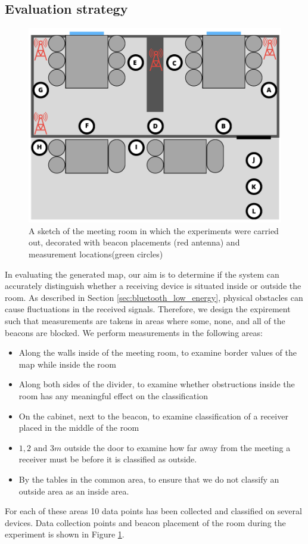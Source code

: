 \subsection{Evaluation strategy} %
\begin{figure}[h]
    \centering
    \includegraphics[scale=0.5]{images/experiment_setup.png}
    \caption{A sketch of the meeting room in which the experiments were carried out, decorated with beacon placements (red antenna) and measurement locations(green circles)}
    \label{fig:experiment_setup}
\end{figure}
In evaluating the generated map, our aim is to determine if the system can accurately distinguish whether a receiving device is situated inside or outside the room.
As described in Section \ref{sec:bluetooth_low_energy}, physical obstacles can cause fluctuations in the received signals. 
Therefore, we design the expirement such that measurements are takens in areas where some, none, and all of the beacons are blocked. 
We perform measurements in the following areas:
\begin{itemize}
    \item Along the walls inside of the meeting room, to examine border values of the map while inside the room
    \item Along both sides of the divider, to examine whether obstructions inside the room has any meaningful effect on the classification
    \item On the cabinet, next to the beacon, to examine classification of a receiver placed in the middle of the room
    \item $1,2 \text{ and } 3m$ outside the door to examine how far away from the meeting a receiver must be before it is classified as outside.
    \item By the tables in the common area, to ensure that we do not classify an outside area as an inside area.
\end{itemize}
For each of these areas 10 data points has been collected and classified on several devices.
Data collection points and beacon placement of the room during the experiment is shown in Figure \ref{fig:experiment_setup}. 
